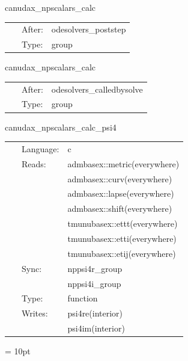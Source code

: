 
\hspace{5mm} canudax\_npscalars\_calc 

\hspace{5mm}{\it calculate newman-penrose scalars } 


\hspace{5mm}

 \begin{tabular*}{160mm}{cll} 
~ & After:  & odesolvers\_poststep \\ 
~ & Type:  & group \\ 
\end{tabular*} 


\vspace{5mm}


\hspace{5mm} canudax\_npscalars\_calc 

\hspace{5mm}{\it calculate newman-penrose scalars } 


\hspace{5mm}

 \begin{tabular*}{160mm}{cll} 
~ & After:  & odesolvers\_calledbysolve \\ 
~ & Type:  & group \\ 
\end{tabular*} 


\vspace{5mm}


\hspace{5mm} canudax\_npscalars\_calc\_psi4 

\hspace{5mm}{\it calculate newman-penrose scalar psi4 as a grid function } 


\hspace{5mm}

 \begin{tabular*}{160mm}{cll} 
~ & Language:  & c \\ 
~ & Reads:  & admbasex::metric(everywhere) \\ 
~& ~ &admbasex::curv(everywhere)\\ 
~& ~ &admbasex::lapse(everywhere)\\ 
~& ~ &admbasex::shift(everywhere)\\ 
~& ~ &tmunubasex::ettt(everywhere)\\ 
~& ~ &tmunubasex::etti(everywhere)\\ 
~& ~ &tmunubasex::etij(everywhere)\\ 
~ & Sync:  & nppsi4r\_group \\ 
~& ~ &nppsi4i\_group\\ 
~ & Type:  & function \\ 
~ & Writes:  & psi4re(interior) \\ 
~& ~ &psi4im(interior)\\ 
\end{tabular*} 



\vspace{5mm}\parskip = 10pt 

